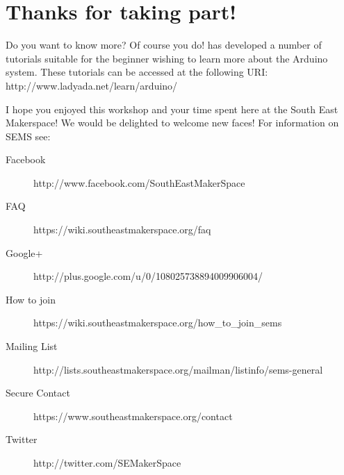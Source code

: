 \newpage
\chapter*{Thanks for taking part!}

Do you want to know more? Of course you do! \citet{fried-12} has developed a number of tutorials suitable for the beginner wishing to learn more about the \gls{Arduino} system. These tutorials can be accessed at the following URI: http://www.ladyada.net/learn/arduino/

I hope you enjoyed this workshop and your time spent here at the South East Makerspace! We would be delighted to welcome new faces! For information on SEMS see:

\begin{description}
	\item[Facebook] http://www.facebook.com/SouthEastMakerSpace
	\item[FAQ] https://wiki.southeastmakerspace.org/faq
	\item[Google+] http://plus.google.com/u/0/108025738894009906004/
	\item[How to join] https://wiki.southeastmakerspace.org/how\_to\_join\_sems
	\item[Mailing List] http://lists.southeastmakerspace.org/mailman/listinfo/sems-general
	\item[Secure Contact] https://www.southeastmakerspace.org/contact
	\item[Twitter] http://twitter.com/SEMakerSpace
\end{description} 




